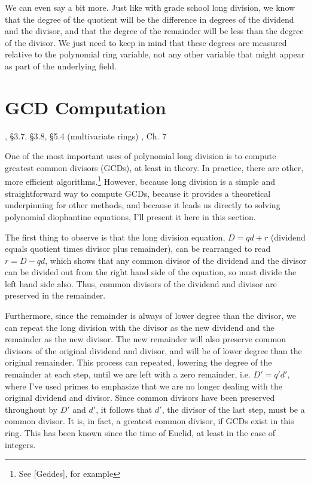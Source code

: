 We can even say a bit more.  Just like with grade school long
division, we know that the degree of the quotient will be the
difference in degrees of the dividend and the divisor, and that the
degree of the remainder will be less than the degree of the divisor.
We just need to keep in mind that these degrees are measured relative
to the polynomial ring variable, not any other variable that might
appear as part of the underlying field.

\section{GCD Computation}
, \S3.7, \S3.8, \S5.4 (multivariate rings)\hfil\break
\hbox{}\qquad [Geddes], Ch. 7

One of the most important uses of polynomial long division is to
compute greatest common divisors (GCDs), at least in theory.  In
practice, there are other, more efficient algorithms.\footnote{See
[Geddes], for example} However, because long division is a simple and
straightforward way to compute GCDs, because it provides a theoretical
underpinning for other methods, and because it leads us directly to
solving polynomial diophantine equations, I'll present it here in this
section.

The first thing to observe is that the long division equation, $D = qd
+ r$ (dividend equals quotient times divisor plus remainder), can be
rearranged to read $r = D - qd$, which shows that any common divisor
of the dividend and the divisor can be divided out from the right hand
side of the equation, so must divide the left hand side also.  Thus,
common divisors of the dividend and divisor are preserved in the
remainder.

Furthermore, since the remainder is always of lower degree than the
divisor, we can repeat the long division with the divisor as the new
dividend and the remainder as the new divisor.  The new remainder will
also preserve common divisors of the original dividend and divisor,
and will be of lower degree than the original remainder.  This process
can repeated, lowering the degree of the remainder at each step, until
we are left with a zero remainder, i.e. $D' = q' d'$, where I've used
primes to emphasize that we are no longer dealing with the original
dividend and divisor.  Since common divisors have been preserved
throughout by $D'$ and $d'$, it follows that $d'$, the divisor of the
last step, must be a common divisor.  It is, in fact, a greatest
common divisor, if GCDs exist in this ring.  This has been known since
the time of Euclid, at least in the case of integers.

